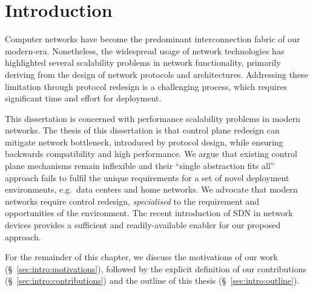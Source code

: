 \chapter{Introduction} \label{s:introduction:introduction}

Computer networks have become the predominant interconnection fabric of our
modern-era. Nonetheless, the widespread usage of network technologies has
highlighted several scalability problems in network functionality, primarily
deriving from the design of network protocols and architectures.  Addressing
these limitation through protocol redesign is a challenging process, which
requires significant time and effort for deployment. 

This dissertation is concerned with performance scalability problems in modern
networks.  The thesis of this dissertation is that control plane redesign can
mitigate network bottleneck, introduced by protocol design, while ensuring
backwards compatibility and high performance. We argue that existing control
plane mechanisms remain inflexible and their ``single abstraction fits all''
approach fails to fulfil the unique requirements for a set of novel deployment
environments, e.g.~data centers and home networks.  We advocate that modern
networks require control redesign, \textit{specialised} to the requirement and
opportunities of  the environment. The recent introduction of SDN in network
devices provides a sufficient and readily-available enabler for our proposed
approach. 

For the remainder of this chapter, we discuss the motivations of our work
(\S~\ref{sec:intro:motivations}), followed by the explicit definition of our
contributions (\S~\ref{sec:intro:contributions}) and  the outline of this thesis
(\S~\ref{sec:intro:outline}).



